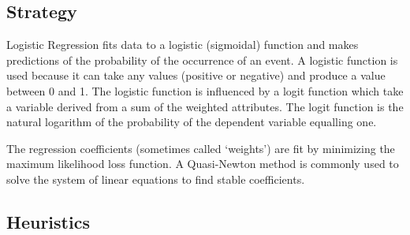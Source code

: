 \subsection{Strategy}
Logistic Regression fits data to a logistic (sigmoidal) function and makes predictions of the probability of the occurrence of an event. 
A logistic function is used because it can take any values (positive or negative) and produce a value between 0 and 1. The logistic function is influenced by a logit function which take a variable derived from a sum of the weighted attributes. The logit function is the natural logarithm of the probability of the dependent variable equalling one.

The regression coefficients (sometimes called `weights') are fit by minimizing the maximum likelihood loss function. A Quasi-Newton method is commonly used to solve the system of linear equations to find stable coefficients.

\subsection{Heuristics}

